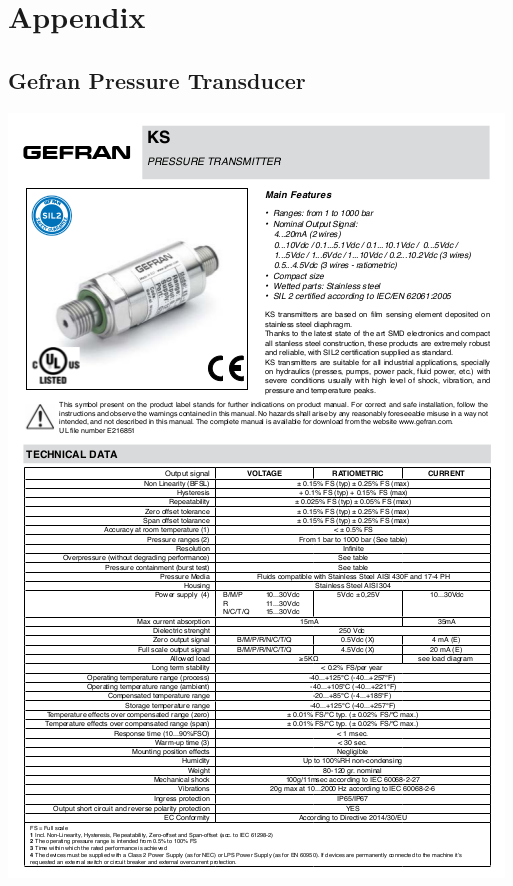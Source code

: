 \documentclass[paper=a4, fontsize=11pt, abstract=on]{scrartcl}
\numberwithin{equation}{section}		%
\numberwithin{figure}{section}			%
\numberwithin{table}{section}				%
\begin{document}
\appendix
\section{Appendix} \label{App:Appendix}
\subsection{Gefran Pressure Transducer}
\centering
\includegraphics[width=1.0\linewidth]{dpress}
\end{document}
